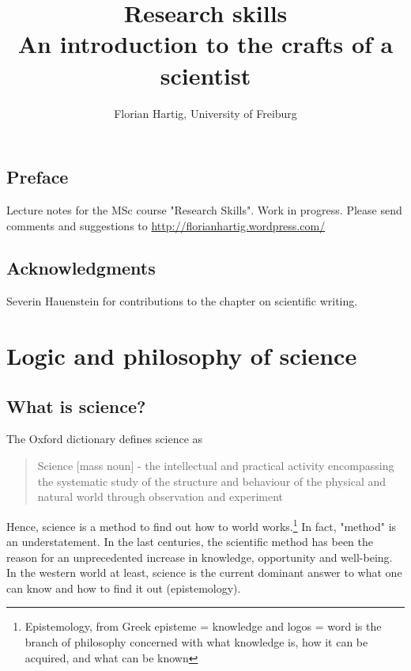 \documentclass{tufte-book}
\title{Research skills\\
\large{An introduction to the crafts of a scientist}}
\author{Florian Hartig, University of Freiburg}
\begin{document}
\let\cleardoublepage\clearpage
\maketitle
\newpage
\tableofcontents

\newpage


\section*{Preface}

Lecture notes for the MSc course "Research Skills". Work in progress. Please send comments and suggestions to \href{http://florianhartig.wordpress.com/}{http://florianhartig.wordpress.com/}


\section*{Acknowledgments}

Severin Hauenstein for contributions to the chapter on scientific writing.

\chapter{Logic and philosophy of science}

\section{What is science?}

The Oxford dictionary defines science as 

\begin{quote}
Science [mass noun] - the intellectual and practical activity encompassing the systematic study of the structure and behaviour of the physical and natural world through observation and experiment
\end{quote}

Hence, science is a method to find out how to world works.\footnote{Epistemology, from Greek episteme = knowledge and logos = word is the branch of philosophy concerned with what knowledge is, how it can be acquired, and what can be known} In fact, "method" is an understatement. In the last centuries, the scientific method has been the reason for an unprecedented increase in knowledge, opportunity and well-being. In the western world at least, science is the current dominant answer to what one can know and how to find it out (epistemology). 
\end{document}
